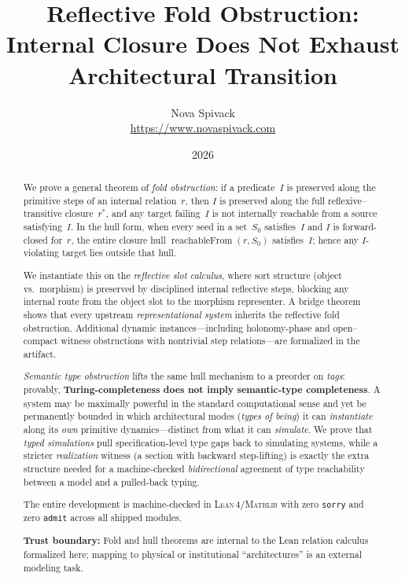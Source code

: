 \documentclass[11pt]{article}
\title{Reflective Fold Obstruction:\\
Internal Closure Does Not Exhaust Architectural Transition}
\author{Nova Spivack\\
\url{https://www.novaspivack.com}}
\date{2026}
\theoremstyle{plain}
\theoremstyle{definition}
\theoremstyle{remark}
\newcommand{\Lean}{\textsc{Lean\,4}}
\newcommand{\Mathlib}{\textsc{Mathlib}}
\newcommand{\reachableFrom}{\operatorname{reachableFrom}}
\begin{document}
\maketitle
\NovaZenodoAfterTitle


\begin{abstract}
\raggedright
We prove a general theorem of \emph{fold obstruction}: if a predicate~$I$ is preserved
along the primitive steps of an internal relation~$r$, then $I$ is preserved along the
full reflexive--transitive closure~$r^{*}$, and any target failing~$I$ is not internally
reachable from a source satisfying~$I$.  In the hull form, when every seed in a
set~$S_0$ satisfies~$I$ and $I$ is forward-closed for~$r$, the entire closure hull
$\reachableFrom(r,S_0)$ satisfies~$I$; hence any $I$-violating target lies outside
that hull.

We instantiate this on the \emph{reflective slot calculus}, where sort structure (object
vs.\ morphism) is preserved by disciplined internal reflective steps, blocking any
internal route from the object slot to the morphism representer.  A bridge theorem
shows that every upstream \emph{representational system} inherits the reflective fold
obstruction.  Additional dynamic instances---including holonomy-phase and open--compact
witness obstructions with nontrivial step relations---are formalized in the artifact.

\emph{Semantic type obstruction} lifts the same hull mechanism to a preorder on
\emph{tags}: provably, \textbf{Turing-completeness does not imply semantic-type
completeness}.  A system may be maximally powerful in the standard computational sense and
yet be permanently bounded in which architectural modes (\emph{types of being}) it can
\emph{instantiate} along its \emph{own} primitive dynamics---distinct from what it can
\emph{simulate}.  We prove that \emph{typed simulations} pull specification-level type gaps
back to simulating systems, while a stricter \emph{realization} witness (a section with
backward step-lifting) is exactly the extra structure needed for a machine-checked
\emph{bidirectional} agreement of type reachability between a model and a pulled-back
typing.

The entire development is machine-checked in \Lean{}/\Mathlib{} with zero \texttt{sorry}
and zero \texttt{admit} across all shipped modules.

\textbf{Trust boundary:} Fold and hull theorems are internal to the Lean relation calculus formalized here; mapping to physical or institutional ``architectures'' is an external modeling task.

\NovaZenodoInAbstract
\end{abstract}
\end{document}
